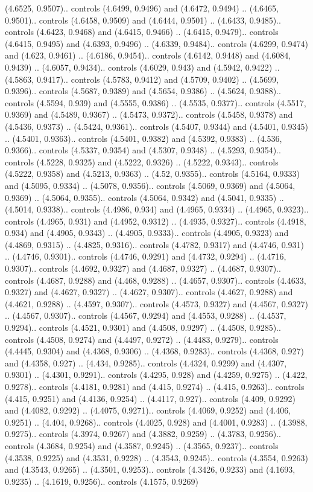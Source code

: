 (4.6525, 0.9507).. controls (4.6499, 0.9496) and (4.6472, 0.9494) .. (4.6465, 0.9501).. controls (4.6458, 0.9509) and (4.6444, 0.9501) .. (4.6433, 0.9485).. controls (4.6423, 0.9468) and (4.6415, 0.9466) .. (4.6415, 0.9479).. controls (4.6415, 0.9495) and (4.6393, 0.9496) .. (4.6339, 0.9484).. controls (4.6299, 0.9474) and (4.623, 0.9461) .. (4.6186, 0.9454).. controls (4.6142, 0.9448) and (4.6084, 0.9439) .. (4.6057, 0.9434).. controls (4.6029, 0.943) and (4.5942, 0.9422) .. (4.5863, 0.9417).. controls (4.5783, 0.9412) and (4.5709, 0.9402) .. (4.5699, 0.9396).. controls (4.5687, 0.9389) and (4.5654, 0.9386) .. (4.5624, 0.9388).. controls (4.5594, 0.939) and (4.5555, 0.9386) .. (4.5535, 0.9377).. controls (4.5517, 0.9369) and (4.5489, 0.9367) .. (4.5473, 0.9372).. controls (4.5458, 0.9378) and (4.5436, 0.9373) .. (4.5424, 0.9361).. controls (4.5407, 0.9344) and (4.5401, 0.9345) .. (4.5401, 0.9363).. controls (4.5401, 0.9382) and (4.5392, 0.9383) .. (4.536, 0.9366).. controls (4.5337, 0.9354) and (4.5307, 0.9348) .. (4.5293, 0.9354).. controls (4.5228, 0.9325) and (4.5222, 0.9326) .. (4.5222, 0.9343).. controls (4.5222, 0.9358) and (4.5213, 0.9363) .. (4.52, 0.9355).. controls (4.5164, 0.9333) and (4.5095, 0.9334) .. (4.5078, 0.9356).. controls (4.5069, 0.9369) and (4.5064, 0.9369) .. (4.5064, 0.9355).. controls (4.5064, 0.9342) and (4.5041, 0.9335) .. (4.5014, 0.9338).. controls (4.4986, 0.934) and (4.4965, 0.9334) .. (4.4965, 0.9323).. controls (4.4965, 0.931) and (4.4952, 0.9312) .. (4.4935, 0.9327).. controls (4.4918, 0.934) and (4.4905, 0.9343) .. (4.4905, 0.9333).. controls (4.4905, 0.9323) and (4.4869, 0.9315) .. (4.4825, 0.9316).. controls (4.4782, 0.9317) and (4.4746, 0.931) .. (4.4746, 0.9301).. controls (4.4746, 0.9291) and (4.4732, 0.9294) .. (4.4716, 0.9307).. controls (4.4692, 0.9327) and (4.4687, 0.9327) .. (4.4687, 0.9307).. controls (4.4687, 0.9288) and (4.468, 0.9288) .. (4.4657, 0.9307).. controls (4.4633, 0.9327) and (4.4627, 0.9327) .. (4.4627, 0.9307).. controls (4.4627, 0.9288) and (4.4621, 0.9288) .. (4.4597, 0.9307).. controls (4.4573, 0.9327) and (4.4567, 0.9327) .. (4.4567, 0.9307).. controls (4.4567, 0.9294) and (4.4553, 0.9288) .. (4.4537, 0.9294).. controls (4.4521, 0.9301) and (4.4508, 0.9297) .. (4.4508, 0.9285).. controls (4.4508, 0.9274) and (4.4497, 0.9272) .. (4.4483, 0.9279).. controls (4.4445, 0.9304) and (4.4368, 0.9306) .. (4.4368, 0.9283).. controls (4.4368, 0.927) and (4.4358, 0.927) .. (4.434, 0.9285).. controls (4.4324, 0.9299) and (4.4307, 0.9301) .. (4.4301, 0.9291).. controls (4.4295, 0.928) and (4.4259, 0.9275) .. (4.422, 0.9278).. controls (4.4181, 0.9281) and (4.415, 0.9274) .. (4.415, 0.9263).. controls (4.415, 0.9251) and (4.4136, 0.9254) .. (4.4117, 0.927).. controls (4.409, 0.9292) and (4.4082, 0.9292) .. (4.4075, 0.9271).. controls (4.4069, 0.9252) and (4.406, 0.9251) .. (4.404, 0.9268).. controls (4.4025, 0.928) and (4.4001, 0.9283) .. (4.3988, 0.9275).. controls (4.3974, 0.9267) and (4.3882, 0.9259) .. (4.3783, 0.9256).. controls (4.3684, 0.9254) and (4.3587, 0.9245) .. (4.3565, 0.9237).. controls (4.3538, 0.9225) and (4.3531, 0.9228) .. (4.3543, 0.9245).. controls (4.3554, 0.9263) and (4.3543, 0.9265) .. (4.3501, 0.9253).. controls (4.3426, 0.9233) and (4.1693, 0.9235) .. (4.1619, 0.9256).. controls (4.1575, 0.9269) 